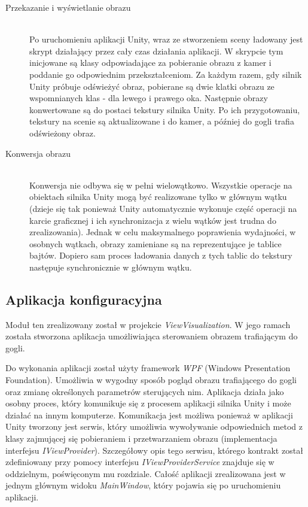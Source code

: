\documentclass[a4paper,11pt,twoside]{report}
\theoremstyle{definition}
\begin{document}
\begin{description}
\item [Przekazanie i wyświetlanie obrazu] \hfill \\
Po uruchomieniu aplikacji Unity, wraz ze stworzeniem sceny ładowany jest skrypt działający przez cały czas działania aplikacji. W skrypcie tym inicjowane  są klasy odpowiadające za pobieranie obrazu z kamer i poddanie go odpowiednim przekształceniom. Za każdym razem, gdy silnik Unity próbuje odświeżyć obraz, pobierane są dwie klatki obrazu ze wspomnianych klas - dla lewego i prawego oka. Następnie obrazy konwertowane są do postaci tekstury silnika Unity. Po ich przygotowaniu, tekstury na scenie są aktualizowane i do kamer, a później do gogli trafia odświeżony obraz.
\item [Konwersja obrazu] \hfill \\
Konwersja nie odbywa się w pełni wielowątkowo. Wszystkie operacje na obiektach silnika Unity mogą być realizowane tylko w głównym wątku (dzieje się tak ponieważ Unity automatycznie wykonuje część operacji na karcie graficznej i ich synchronizacja z wielu wątków jest trudna do zrealizowania). Jednak w celu maksymalnego poprawienia wydajności, w osobnych wątkach, obrazy zamieniane są na reprezentujące je tablice bajtów. Dopiero sam proces ładowania danych z tych tablic do tekstury następuje synchronicznie w głównym wątku. 
\end{description}

\subsection{Aplikacja konfiguracyjna}
Moduł ten zrealizowany został w projekcie \textit{ViewVisualization}. W jego ramach została stworzona aplikacja umożliwiająca sterowaniem obrazem trafiającym do gogli.

Do wykonania aplikacji został użyty framework \textit{WPF} (Windows Presentation Foundation). Umożliwia w wygodny sposób pogląd obrazu trafiającego do gogli oraz zmianę określonych parametrów sterujących nim. Aplikacja działa jako osobny proces, który komunikuje się z procesem aplikacji silnika Unity i może działać na innym komputerze. Komunikacja jest możliwa ponieważ w aplikacji Unity tworzony jest serwis, który umożliwia wywoływanie odpowiednich metod z klasy zajmującej się pobieraniem i przetwarzaniem obrazu (implementacja interfejsu \textit{IViewProvider}). Szczegółowy opis tego serwisu, którego kontrakt został zdefiniowany przy pomocy interfejsu \textit{IViewProviderService} znajduje się w oddzielnym, poświęconym mu rozdziale. Całość aplikacji zrealizowana jest w jednym głównym widoku \textit{MainWindow}, który pojawia się po uruchomieniu aplikacji. 
\end{document}
